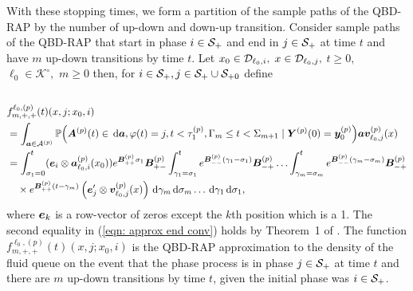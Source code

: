 With these stopping times, we form a partition of the sample paths of the QBD-RAP by the number of up-down and down-up transition. Consider sample paths of the QBD-RAP that start in phase \(i\in\mathcal{S}_+\) and end in \(j\in\mathcal{S}_+\) at time \(t\) and have \(m\) up-down transitions by time \(t\). Let \(x_0\in\mathcal{D}_{\ell_0,i},\) \(x\in\mathcal{D}_{\ell_0,j},\) \(t\geq0,\) \(\ell_0\in\mathcal K^\circ,\) \(m\geq 0\) then, for \(i\in\mathcal{S}_+,j\in\mathcal S_+\cup\mathcal S_{+0}\) define
\begin{align}
	&\nonumber
	\\&f^{\ell_0,(p)}_{m,+,+}(t)( x,j; x_0,i)  \nonumber
	\\&=\int_{\boldsymbol a \in\mathcal A^{(p)}}\mathbb P\Big(\boldsymbol A^{(p)}(t)\in \, \mathrm{d} \boldsymbol a, \varphi(t) = j, t<\tau_1^{(p)}, \Gamma_m\leq t<\Sigma_{m+1} \nonumber
	\mid \boldsymbol Y^{(p)}(0)=\boldsymbol y_0^{(p)}\Big)
	\boldsymbol a{\boldsymbol v}_{\ell_0,j}^{(p)}(x) \nonumber
	\\
	&=\int_{\sigma_1=0}^t (\boldsymbol e_i\otimes \boldsymbol  a_{\ell_0,i}^{(p)}(x_0)) e^{\boldsymbol{B}^{(p)}_{++}\sigma_1}\boldsymbol{B}^{(p)}_{+-}	\nonumber
	\int_{\gamma_1=\sigma_1}^{t} e^{\boldsymbol{B}^{(p)}_{--}(\gamma_1-\sigma_1)}\boldsymbol{B}^{(p)}_{-+}
	\hdots 
	 \int_{\gamma_m=\sigma_{m}}^{t} e^{\boldsymbol{B}^{(p)}_{--}(\gamma_m-\sigma_{m})}\boldsymbol{B}^{(p)}_{-+}\\&\quad\times
	e^{\boldsymbol{B}^{(p)}_{++}(t-\gamma_m)}\left(\boldsymbol e_j'{}  \otimes {\boldsymbol v}_{\ell_0,j}^{(p)}(x)\right) 
	\, \mathrm{d} \gamma_m\, \mathrm{d} \sigma_m\dots \, \mathrm{d} \gamma_1\, \mathrm{d} \sigma_1 , \label{eqn: approx end conv}
\end{align}
where \(\boldsymbol e_k\) is a row-vector of zeros except the \(k\)th position which is a 1. The second equality in (\ref{eqn: approx end conv}) holds by Theorem~1 of \cite{bn2010}. The function \(f^{\ell_0,(p)}_{m,+,+}(t)( x,j; x_0,i)\) is the QBD-RAP approximation to the density of the fluid queue on the event that the phase process is in phase \(j\in\mathcal{S}_+\) at time \(t\) and there are \(m\) up-down transitions by time \(t\), given the initial phase was \(i\in\mathcal{S}_+\). 

